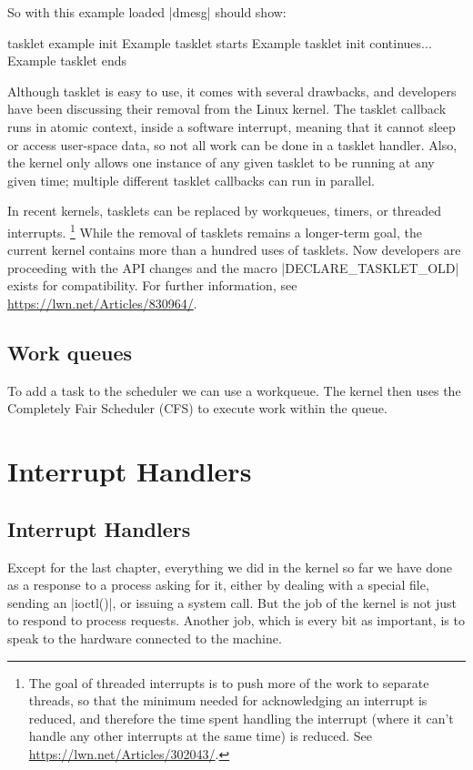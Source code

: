 \documentclass[10pt, oneside]{book}
\begin{document}

So with this example loaded \sh|dmesg| should show:

\begin{codebash}
tasklet example init
Example tasklet starts
Example tasklet init continues...
Example tasklet ends
\end{codebash}
Although tasklet is easy to use, it comes with several drawbacks, and developers have been discussing their removal from the Linux kernel.
The tasklet callback runs in atomic context, inside a software interrupt, meaning that it cannot sleep or access user-space data, so not all work can be done in a tasklet handler.
Also, the kernel only allows one instance of any given tasklet to be running at any given time; multiple different tasklet callbacks can run in parallel.

In recent kernels, tasklets can be replaced by workqueues, timers, or threaded interrupts.
\footnote{
The goal of threaded interrupts is to push more of the work to separate threads,
so that the minimum needed for acknowledging an interrupt is reduced,
and therefore the time spent handling the interrupt (where it can't handle any other interrupts at the same time) is reduced.
See \url{https://lwn.net/Articles/302043/}.
}
While the removal of tasklets remains a longer-term goal, the current kernel contains more than a hundred uses of tasklets.
Now developers are proceeding with the API changes and the macro \cpp|DECLARE_TASKLET_OLD| exists for compatibility.
For further information, see \url{https://lwn.net/Articles/830964/}.

\subsection{Work queues}
\label{sec:workqueue}
To add a task to the scheduler we can use a workqueue.
The kernel then uses the Completely Fair Scheduler (CFS) to execute work within the queue.


\section{Interrupt Handlers}
\label{sec:interrupt_handler}
\subsection{Interrupt Handlers}
\label{sec:irq}
Except for the last chapter, everything we did in the kernel so far we have done as a response to a process asking for it, either by dealing with a special file, sending an \cpp|ioctl()|, or issuing a system call.
But the job of the kernel is not just to respond to process requests.
Another job, which is every bit as important, is to speak to the hardware connected to the machine.
\end{document}
